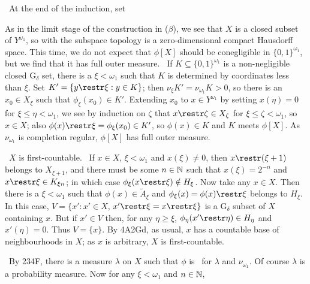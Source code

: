 {\medskip

\qquad\grheadc\ At the end of the induction, set


\noindent As in the limit stage of the construction in ($\beta$), we see
that $X$ is a closed subset of $Y^{\omega_1}$, so with the subspace
topology is a zero-dimensional compact Hausdorff space.
This time, we do not
expect that $\phi[X]$ should be conegligible in $\{0,1\}^{\omega_1}$, but
we find that it has full outer measure.   \Prf\ If
$K\subseteq\{0,1\}^{\omega_1}$ is a
non-negligible closed G$_{\delta}$ set, there is a $\xi<\omega_1$
such that $K$ is determined by coordinates less than $\xi$.   Set
$K'=\{y\restr\xi:y\in K\}$;  then $\nu_{\xi}K'=\nu_{\omega_1}K>0$,
so there is an $x_0\in X_{\xi}$ such that $\phi_{\xi}(x_0)\in K'$.
Extending $x_0$ to $x\in Y^{\omega_1}$ by setting $x(\eta)=0$ for
$\xi\le\eta<\omega_1$, we see by induction on $\zeta$ that
$x\restr\zeta\in X_{\zeta}$ for $\xi\le\zeta<\omega_1$, so
$x\in X$;  also $\phi(x)\restr\xi=\phi_{\xi}(x_0)\in K'$, so
$\phi(x)\in K$ and $K$ meets $\phi[X]$.   As $\nu_{\omega_1}$
is completion regular, $\phi[X]$ has full outer measure.\ \Qed

\medskip

\qquad\grheadd\ $X$ is first-countable.   \Prf\ If $x\in X$, $\xi<\omega_1$
and $x(\xi)\ne 0$, then $x\restr(\xi+1)$ belongs to $X_{\xi+1}$, and there
must be some $n\in\Bbb N$ such that $x(\xi)=2^{-n}$ and
$x\restr\xi\in K_{\xi n}$;  in which case
$\phi_{\xi}(x\restr\xi)\notin H_{\xi}$.   Now take any $x\in X$.
Then there is a $\xi<\omega_1$ such that $\phi(x)\in\tilde A_{\xi}$
and $\phi_{\xi}(x)=\phi(x)\restr\xi$ belongs to $H_{\xi}$.   In this case,
$V=\{x':x'\in X$, $x'\restr\xi=x\restr\xi\}$ is a G$_{\delta}$ subset of
$X$ containing $x$.   But if $x'\in V$ then, for any $\eta\ge\xi$,
$\phi_{\eta}(x'\restr\eta)\in H_{\eta}$ and $x'(\eta)=0$.   Thus $V=\{x\}$.
By 4A2Gd, as usual, $x$ has a countable base of neighbourhoods in $X$;
as $x$ is arbitrary, $X$ is first-countable.\ \Qed

\medskip

\qquad\grheade\  By 234F, there is a measure $\lambda$ on
$X$ such that $\phi$ is \imp\ for $\lambda$ and $\nu_{\omega_1}$.
Of course $\lambda$ is a probability measure.   Now for
any $\xi<\omega_1$ and $n\in\Bbb N$,


}
